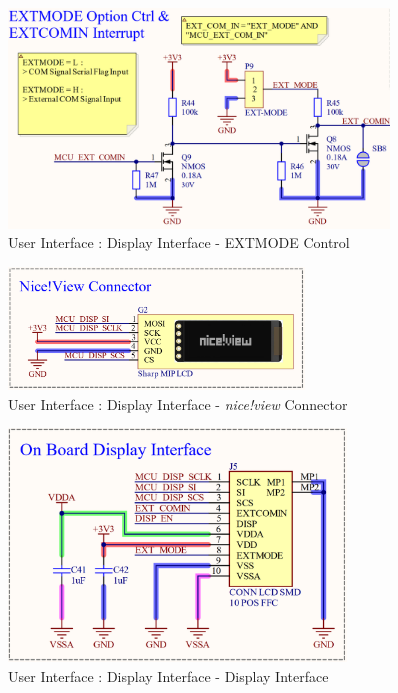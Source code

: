 \documentclass[report.tex]{subfiles}
\begin{document}
\begin{figure}[H]
	\centering
	\includegraphics[width=0.9\textwidth]{Include/Figure/Hardware/LTEWatch_LTEW_User_Interface_EXTMODE}
	\caption{User Interface : Display Interface - EXTMODE Control}
	\label{fig:LTEWatch_LTEW_User_Interface_EXTMODE}
\end{figure}

\begin{figure}[H]
	\centering
	\includegraphics[width=0.7\textwidth]{Include/Figure/Hardware/LTEWatch_LTEW_User_Interface_NiceViewConnector}
	\caption{User Interface : Display Interface - \textit{nice!view} Connector}
	\label{fig:LTEWatch_LTEW_User_Interface_NiceViewConnector}
\end{figure}


\begin{figure}[H]
	\centering
	\includegraphics[width=0.8\textwidth]{Include/Figure/Hardware/LTEWatch_LTEW_User_Interface_OnBoard_Dsp_Interface}
	\caption{User Interface : Display Interface - Display Interface}
	\label{fig:LTEWatch_LTEW_User_Interface_OnBoard_Dsp_Interface}
\end{figure}
\end{document}
